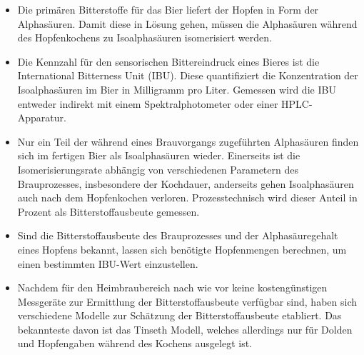 \documentclass[a4paper,parskip=half]{scrartcl}
\begin{document}
\begin{itemize}
\item Die primären Bitterstoffe für das Bier liefert der Hopfen in Form der Alphasäuren. Damit diese in Lösung gehen, müssen die Alphasäuren während des Hopfenkochens zu Isoalphasäuren isomerisiert werden.
   
\item Die Kennzahl für den sensorischen Bittereindruck eines Bieres ist die International Bitterness Unit (IBU). Diese quantifiziert die Konzentration der Isoalphasäuren im Bier in Milligramm pro Liter. Gemessen wird die IBU entweder indirekt mit einem Spektralphotometer oder einer HPLC-Apparatur.

\item Nur ein Teil der während eines Brauvorgangs zugeführten Alphasäuren finden sich im fertigen Bier als Isoalphasäuren wieder. Einerseits ist die Isomerisierungsrate abhängig von verschiedenen Parametern des Brauprozesses, insbesondere der Kochdauer, anderseits gehen Isoalphasäuren auch nach dem Hopfenkochen verloren. Prozesstechnisch wird dieser Anteil in Prozent als Bitterstoffausbeute gemessen.

\item Sind die Bitterstoffausbeute des Brauprozesses und der Alphasäuregehalt eines Hopfens bekannt, lassen sich benötigte Hopfenmengen berechnen, um einen bestimmten IBU-Wert einzustellen.

\item Nachdem für den Heimbraubereich nach wie vor keine kostengünstigen Messgeräte zur Ermittlung der Bitterstoffausbeute verfügbar sind, haben sich verschiedene Modelle zur Schätzung der Bitterstoffausbeute etabliert. Das bekannteste davon ist das Tinseth Modell, welches allerdings nur für Dolden und Hopfengaben während des Kochens ausgelegt ist.
\end{itemize}

\printbibliography[title=Quellen]
\end{document}
